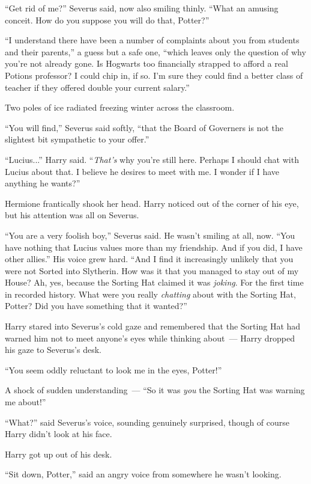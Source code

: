 ``Get rid of me?'' Severus said, now also smiling thinly. ``What an amusing conceit. How do you suppose you will do that, Potter?''

``I understand there have been a number of complaints about you from students and their parents,'' a guess but a safe one, ``which leaves only the question of why you're not already gone. Is Hogwarts too financially strapped to afford a real Potions professor? I could chip in, if so. I'm sure they could find a better class of teacher if they offered double your current salary.''

Two poles of ice radiated freezing winter across the classroom.

``You will find,'' Severus said softly, ``that the Board of Governers is not the slightest bit sympathetic to your offer.''

``Lucius...'' Harry said. ``\emph{That's} why you're still here. Perhaps I should chat with Lucius about that. I believe he desires to meet with me. I wonder if I have anything he wants?''

Hermione frantically shook her head. Harry noticed out of the corner of his eye, but his attention was all on Severus.

``You are a very foolish boy,'' Severus said. He wasn't smiling at all, now. ``You have nothing that Lucius values more than my friendship. And if you did, I have other allies.'' His voice grew hard. ``And I find it increasingly unlikely that you were not Sorted into Slytherin. How was it that you managed to stay out of my House? Ah, yes, because the Sorting Hat claimed it was \emph{joking}. For the first time in recorded history. What were you really \emph{chatting} about with the Sorting Hat, Potter? Did you have something that it wanted?''

Harry stared into Severus's cold gaze and remembered that the Sorting Hat had warned him not to meet anyone's eyes while thinking about~--- Harry dropped his gaze to Severus's desk.

``You seem oddly reluctant to look me in the eyes, Potter!''

A shock of sudden understanding~--- ``So it was \emph{you} the Sorting Hat was warning me about!''

``What?'' said Severus's voice, sounding genuinely surprised, though of course Harry didn't look at his face.

Harry got up out of his desk.

``Sit down, Potter,'' said an angry voice from somewhere he wasn't looking.

